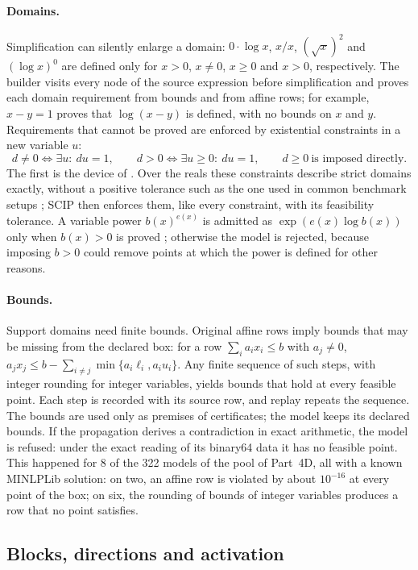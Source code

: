 \paragraph{Domains.}
Simplification can silently enlarge a domain: $0\cdot\log x$, $x/x$,
$(\sqrt x)^2$ and $(\log x)^0$ are defined only for $x>0$, $x\ne0$, $x\ge0$
and $x>0$, respectively. The builder visits every node of the source
expression before simplification and proves each domain requirement from
bounds and from affine rows; for example, $x-y=1$ proves that $\log(x-y)$ is
defined, with no bounds on $x$ and $y$. Requirements that cannot be proved
are enforced by existential constraints in a new variable $u$:
\[
d\ne0\iff\exists u:\ du=1,\qquad d>0\iff\exists u\ge0:\ du=1,\qquad d\ge0\ \text{is imposed directly.}
\]
The first is the device of \citet{Rabinowitsch1930}. Over the reals these
constraints describe strict domains exactly, without a positive tolerance
such as the one used in common benchmark setups \citep{BestuzhevaEtAl2025};
SCIP then enforces them, like every constraint, with its feasibility
tolerance. A variable power $b(x)^{e(x)}$ is admitted as $\exp(e(x)\log b(x))$
only when $b(x)>0$ is proved \citep[compare][]{BelottiEtAl2009}; otherwise
the model is rejected, because imposing $b>0$ could remove points at which
the power is defined for other reasons.

\paragraph{Bounds.}
Support domains need finite bounds. Original affine rows imply bounds that
may be missing from the declared box: for a row $\sum_ia_ix_i\le b$ with
$a_j\ne0$, $a_jx_j\le b-\sum_{i\ne j}\min\{a_i\ell_i,a_iu_i\}$. Any finite
sequence of such steps, with integer rounding for integer variables, yields
bounds that hold at every feasible point. Each step is recorded with its
source row, and replay repeats the sequence. The bounds are used only as
premises of certificates; the model keeps its declared bounds. If the
propagation derives a contradiction in exact arithmetic, the model is refused:
under the exact reading of its binary64 data it has no feasible point. This
happened for 8 of the 322 models of the pool of Part~4D, all with a known
MINLPLib solution: on two, an affine row is violated by about $10^{-16}$ at
every point of the box; on six, the rounding of bounds of integer variables
produces a row that no point satisfies.

\subsection{Blocks, directions and activation}\label{sec:blocks}

